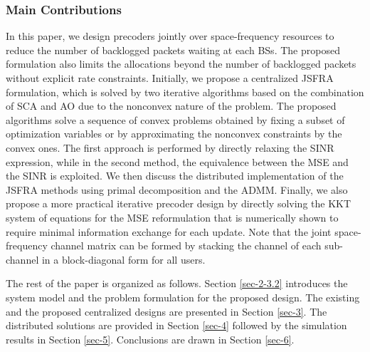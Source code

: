 \subsubsection*{Main Contributions}
In this paper, we design precoders jointly over space-frequency resources to reduce the number of backlogged packets waiting at each \acp{BS}. The proposed formulation also limits the allocations beyond the number of backlogged packets without explicit rate constraints. Initially, we propose a centralized \ac{JSFRA} formulation, which is solved by two iterative algorithms based on the combination of \ac{SCA} and \ac{AO} due to the nonconvex nature of the problem. The proposed algorithms solve a sequence of convex problems obtained by fixing a subset of optimization variables or by approximating the nonconvex constraints by the convex ones. The first approach is performed by directly relaxing the \ac{SINR} expression, while in the second method, the equivalence between the \ac{MSE} and the \ac{SINR} is exploited. We then discuss the distributed implementation of the \ac{JSFRA} methods using primal decomposition and the \ac{ADMM}. Finally, we also propose a more practical iterative precoder design by directly solving the \ac{KKT} system of equations for the \ac{MSE} reformulation that is numerically shown to require minimal information exchange for each update. Note that the joint space-frequency channel matrix can be formed by stacking the channel of each sub-channel in a block-diagonal form for all users.

The rest of the paper is organized as follows. Section \ref{sec-2-3.2} introduces the system model and the problem formulation for the proposed design. The existing and the proposed centralized designs are presented in Section \ref{sec-3}. The distributed solutions are provided in Section \ref{sec-4} followed by the simulation results in Section \ref{sec-5}. Conclusions are drawn in Section \ref{sec-6}.